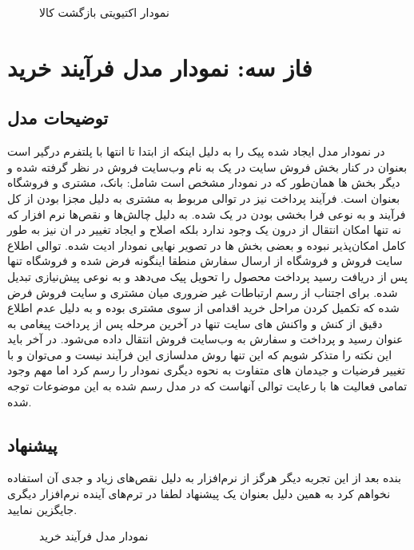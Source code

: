 \documentclass[12pt,onecolumn,a4paper]{article}
\begin{document}
\begin{figure}[!h]
\caption{   نمودار اکتیویتی بازگشت کالا }\label{revact}
\end{figure}

\section{فاز سه: نمودار مدل فرآیند خرید}
\subsection{توضیحات مدل }

در نمودار مدل ایجاد شده پیک را به دلیل اینکه از ابتدا تا انتها با پلتفرم درگیر است بعنوان   در کنار بخش فروش سایت در یک  به نام وب‌سایت فروش در نظر گرفته شده و دیگر بخش ها همان‌‌طور که در نمودار مشخص است شامل: بانک، مشتری و فروشگاه بعنوان  است.
فرآیند پرداخت نیز در توالی مربوط به مشتری به دلیل مجزا بودن از کل فرآیند و به نوعی فرا بخشی بودن در یک  شده.
به دلیل چالش‌ها و نقص‌ها نرم افزار  که نه تنها امکان انتقال از درون یک  وجود ندارد بلکه اصلاح و ایجاد تغییر در ان نیز به طور کامل امکان‌پذیر نبوده و بعضی بخش ها در تصویر نهایی نمودار ادیت شده.
توالی اطلاع سایت فروش و فروشگاه از ارسال سفارش منطقا اینگونه  فرض شده و فروشگاه تنها پس از دریافت رسید پرداخت محصول را تحویل پیک می‌دهد و به نوعی پیش‌نیازی تبدیل شده.
 برای اجتناب از رسم ارتباطات غیر ضروری میان مشتری و سایت فروش فرض شده که تکمیل کردن مراحل خرید اقدامی از سوی مشتری بوده و به دلیل عدم اطلاع دقیق از کنش و واکنش های سایت تنها در آخرین مرحله پس از پرداخت پیغامی به عنوان رسید و پرداخت و سفارش به وب‌سایت فروش انتقال داده می‌شود.
در آخر باید این نکته را متذکر شویم که این تنها روش مدلسازی این فرآیند نیست و می‌توان و با تغییر فرضیات و جیدمان های متفاوت به نحوه دیگری نمودار را رسم کرد اما مهم وجود تمامی فعالیت ها با رعایت توالی آنهاست که در مدل رسم شده به این موضوعات توجه شده.


\subsection{پیشنهاد }
بنده بعد از این تجربه دیگر هرگز از نرم‌افزار  به دلیل نقص‌های زیاد و جدی آن استفاده نخواهم کرد به همین دلیل بعنوان یک پیشنهاد لطفا در ترم‌های آینده نرم‌افزار دیگری جایگزین نمایید.



\newpage
\begin{figure}[!h]
\caption{نمودار مدل فرآیند خرید}\label{sellbpmnpng}
\end{figure}
\end{document}
